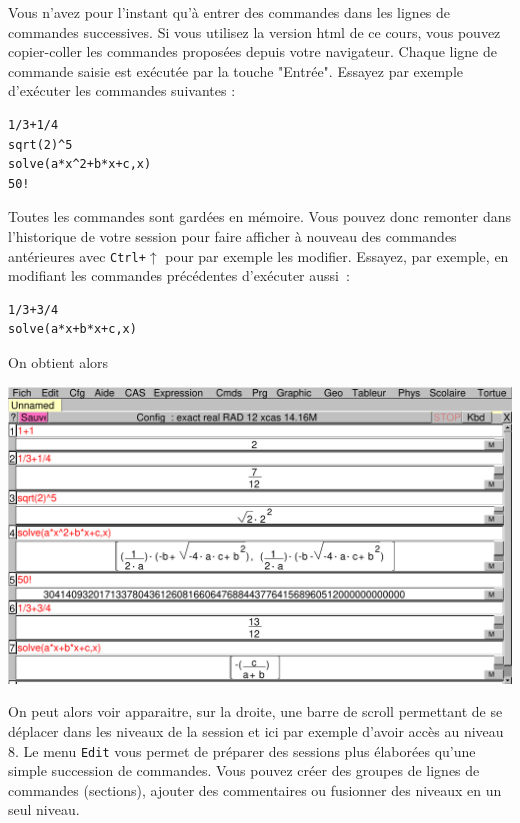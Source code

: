 \documentclass{article}
\begin{document}
Vous n'avez pour l'instant qu'\`a
entrer des commandes dans les lignes de commandes successives. 
Si vous utilisez la
version html de ce cours, vous pouvez copier-coller les commandes
propos\'ees depuis votre navigateur. 
Chaque ligne de commande saisie est ex\'ecut\'ee par la
touche "Entr\'ee". Essayez par exemple d'ex\'ecuter les
commandes suivantes :
\begin{verbatim}
1/3+1/4
sqrt(2)^5
solve(a*x^2+b*x+c,x)
50!
\end{verbatim}
Toutes les commandes sont gard\'ees en m\'emoire.
Vous pouvez donc remonter dans l'historique de votre session pour faire 
afficher \`a nouveau des commandes ant\'erieures avec {\tt Ctrl+$\uparrow$}
pour par exemple les modifier. Essayez, par exemple, en modifiant les 
commandes pr\'ec\'edentes d'ex\'ecuter aussi~:
\begin{verbatim}
1/3+3/4
solve(a*x+b*x+c,x)
\end{verbatim}
On obtient alors 

\centerline{
\includegraphics[width=\textwidth]{ecran2}
}
On peut alors voir apparaitre, sur la droite, une barre de scroll permettant de 
se d\'eplacer dans les niveaux de la session et ici par exemple d'avoir 
acc\`es au niveau 8.
Le menu \verb|Edit| vous permet de pr\'eparer des sessions plus
\'elabor\'ees qu'une simple succession de commandes. Vous pouvez
cr\'eer des groupes de lignes de commandes (sections), 
ajouter des commentaires ou fusionner des niveaux en un seul niveau.
%
\end{document}
